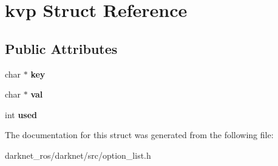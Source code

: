 \hypertarget{structkvp}{}\section{kvp Struct Reference}
\label{structkvp}
\subsection*{Public Attributes}
\begin{DoxyCompactItemize}
\item 
\mbox{\label{structkvp_ada553aa3459987ea43b7219868ba0a8f}} 
char $\ast$ {\bfseries key}
\item 
\mbox{\label{structkvp_acfabb2665bc533f70cce1d708b6e6053}} 
char $\ast$ {\bfseries val}
\item 
\mbox{\label{structkvp_a655effdf8a3be7aca94fe4f199f026fb}} 
int {\bfseries used}
\end{DoxyCompactItemize}


The documentation for this struct was generated from the following file\+:\begin{DoxyCompactItemize}
\item 
darknet\+\_\+ros/darknet/src/option\+\_\+list.\+h\end{DoxyCompactItemize}
